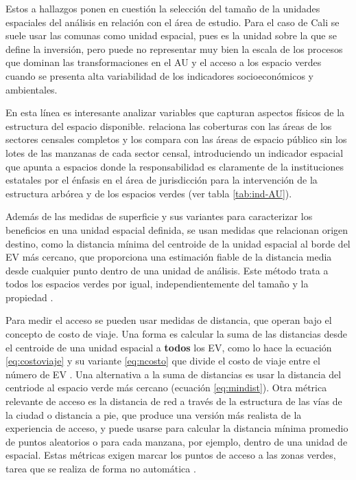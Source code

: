 \documentclass[12pt,]{book}
\begin{document}
Estos a hallazgos ponen en cuestión la selección del tamaño de la
unidades espaciales del análisis en relación con el área de estudio.
Para el caso de Cali se suele usar las comunas como unidad espacial,
pues es la unidad sobre la que se define la inversión, pero puede no
representar muy bien la escala de los procesos que dominan las
transformaciones en el AU y el acceso a los espacio verdes cuando se
presenta alta variabilidad de los indicadores socioeconómicos y
ambientales.

En esta línea es interesante analizar variables que capturan aspectos
físicos de la estructura del espacio disponible.
\citep{landry_street_2009} relaciona las coberturas con las áreas de los
sectores censales completos y los compara con las áreas de espacio
público sin los lotes de las manzanas de cada sector censal,
introduciendo un indicador espacial que apunta a espacios donde la
responsabilidad es claramente de la instituciones estatales por el
énfasis en el área de jurisdicción para la intervención de la estructura
arbórea y de los espacios verdes (ver tabla \ref{tab:ind-AU}).

Además de las medidas de superficie y sus variantes para caracterizar
los beneficios en una unidad espacial definida, se usan medidas que
relacionan origen destino, como la distancia mínima del centroide de la
unidad espacial al borde del EV más cercano, que proporciona una
estimación fiable de la distancia media desde cualquier punto dentro de
una unidad de análisis. Este método trata a todos los espacios verdes
por igual, independientemente del tamaño y la propiedad
\citep{nesbitt_exploring_2016}.

Para medir el acceso se pueden usar medidas de distancia, que operan
bajo el concepto de costo de viaje. Una forma es calcular la suma de las
distancias desde el centroide de una unidad espacial a \textbf{todos}
los EV, como lo hace la ecuación \eqref{eq:costoviaje} y su variante
\eqref{eq:ncosto} que divide el costo de viaje entre el número de EV
\citep{talen_assessing_1998}. Una alternativa a la suma de distancias es
usar la distancia del centriode al espacio verde más cercano (ecuación
\eqref{eq:mindist}). Otra métrica relevante de acceso es la distancia de
red a través de la estructura de las vías de la ciudad o distancia a
pie, que produce una versión más realista de la experiencia de acceso, y
puede usarse para calcular la distancia mínima promedio de puntos
aleatorios o para cada manzana, por ejemplo, dentro de una unidad de
espacial. Estas métricas exigen marcar los puntos de acceso a las zonas
verdes, tarea que se realiza de forma no automática
\citep{zhou_social_2013}.
\end{document}
